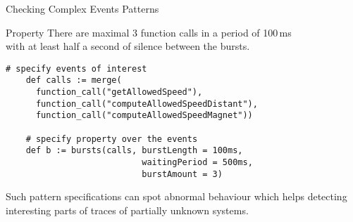\begin{frame}[fragile,t]{Checking Complex Events Patterns}
  \small
  \begin{block}{Property}
    There are maximal 3 function calls in a period of 100\,ms\\
    with at least half a second of silence between the bursts.
  \end{block}

  \begin{lstlisting}[gobble=4,language=tessla]
    # specify events of interest
    def calls := merge(
      function_call("getAllowedSpeed"),
      function_call("computeAllowedSpeedDistant"),
      function_call("computeAllowedSpeedMagnet"))

    # specify property over the events
    def b := bursts(calls, burstLength = 100ms,
                           waitingPeriod = 500ms,
                           burstAmount = 3)
  \end{lstlisting}

  Such \alert{pattern specifications} can spot \alert{abnormal behaviour}
  which helps detecting \alert{interesting parts of traces} of
  \alert{partially unknown systems}.

  \par
\end{frame}
